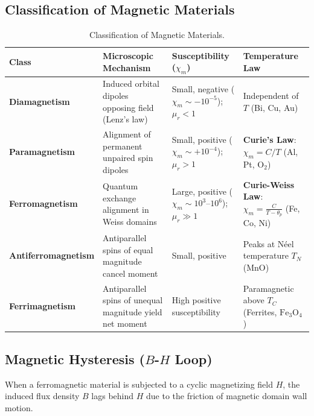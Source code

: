 \subsection{Classification of Magnetic Materials}

\begin{table}[htbp]
\centering
\footnotesize
\renewcommand{\arraystretch}{1.25}
\begin{tabularx}{\linewidth}{l>{\raggedright\arraybackslash}X>{\raggedright\arraybackslash}p{2.8cm}>{\raggedright\arraybackslash}p{3.2cm}}
\toprule
\textbf{Class} & \textbf{Microscopic Mechanism} & \textbf{Susceptibility ($\chi_m$)} & \textbf{Temperature Law} \\
\midrule
\textbf{Diamagnetism} & Induced orbital dipoles opposing field (Lenz's law) & Small, negative ($\chi_m \sim -10^{-5}$); $\mu_r < 1$ & Independent of $T$ (Bi, Cu, Au) \\
\textbf{Paramagnetism} & Alignment of permanent unpaired spin dipoles & Small, positive ($\chi_m \sim +10^{-4}$); $\mu_r > 1$ & \textbf{Curie's Law}: $\chi_m = C/T$ (Al, Pt, $\text{O}_2$) \\
\textbf{Ferromagnetism} & Quantum exchange alignment in Weiss domains & Large, positive ($\chi_m \sim 10^3\text{--}10^6$); $\mu_r \gg 1$ & \textbf{Curie-Weiss Law}: $\chi_m = \frac{C}{T - \theta_p}$ (Fe, Co, Ni) \\
\textbf{Antiferromagnetism} & Antiparallel spins of equal magnitude cancel moment & Small, positive & Peaks at Néel temperature $T_N$ ($\text{MnO}$) \\
\textbf{Ferrimagnetism} & Antiparallel spins of unequal magnitude yield net moment & High positive susceptibility & Paramagnetic above $T_C$ (Ferrites, $\text{Fe}_3\text{O}_4$) \\
\bottomrule
\end{tabularx}
\caption{Classification of Magnetic Materials.}
\label{tab:magnetic-classification-master}
\end{table}

\subsection{Magnetic Hysteresis (\texorpdfstring{$B$-$H$}{B-H} Loop)}
When a ferromagnetic material is subjected to a cyclic magnetizing field $H$, the induced flux density $B$ lags behind $H$ due to the friction of magnetic domain wall motion.

